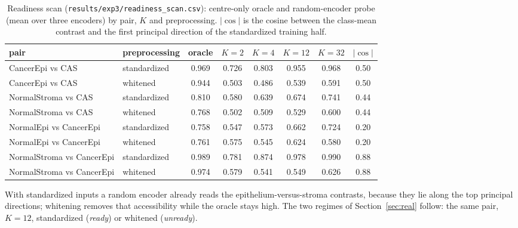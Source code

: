 \begin{table}[h]
\centering\small
\caption{Readiness scan (\texttt{results/exp3/readiness\_scan.csv}): centre-only
oracle and random-encoder probe (mean over three encoders) by pair, $K$ and
preprocessing. $|\cos|$ is the cosine between the class-mean contrast and the
first principal direction of the standardized training half.}
\label{tab:exp3_scan}
\begin{tabular}{llcccccc}
\toprule
pair & preprocessing & oracle & $K=2$ & $K=4$ & $K=12$ & $K=32$ & $|\cos|$ \\
\midrule
CancerEpi vs CAS & standardized & 0.969 & 0.726 & 0.803 & 0.955 & 0.968 & 0.50 \\
CancerEpi vs CAS & whitened & 0.944 & 0.503 & 0.486 & 0.539 & 0.591 & 0.50 \\
NormalStroma vs CAS & standardized & 0.810 & 0.580 & 0.639 & 0.674 & 0.741 & 0.44 \\
NormalStroma vs CAS & whitened & 0.768 & 0.502 & 0.509 & 0.529 & 0.600 & 0.44 \\
NormalEpi vs CancerEpi & standardized & 0.758 & 0.547 & 0.573 & 0.662 & 0.724 & 0.20 \\
NormalEpi vs CancerEpi & whitened & 0.761 & 0.575 & 0.545 & 0.624 & 0.580 & 0.20 \\
NormalStroma vs CancerEpi & standardized & 0.989 & 0.781 & 0.874 & 0.978 & 0.990 & 0.88 \\
NormalStroma vs CancerEpi & whitened & 0.974 & 0.579 & 0.541 & 0.549 & 0.626 & 0.88 \\
\bottomrule
\end{tabular}
\end{table}

With standardized inputs a random encoder already reads the
epithelium-versus-stroma contrasts, because they lie along the top
principal directions; whitening removes that accessibility while the
oracle stays high. The two regimes of Section~\ref{sec:real} follow: the
same pair, $K=12$, standardized (\emph{ready}) or whitened (\emph{unready}).

